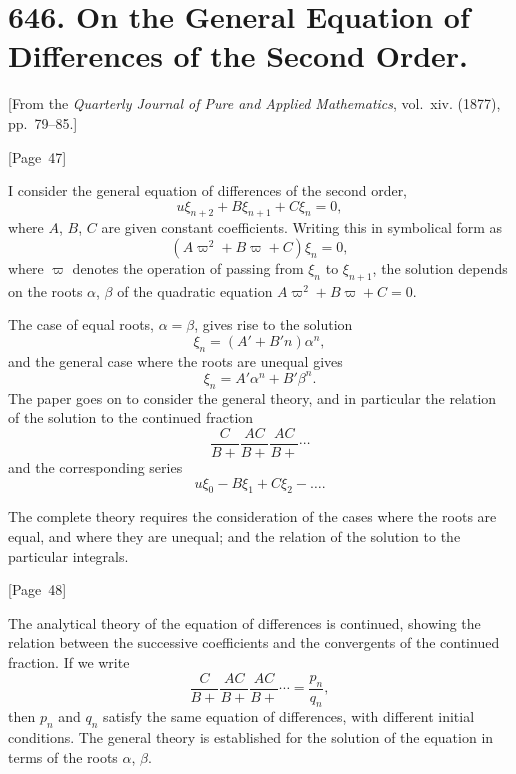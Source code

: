 \documentclass[11pt,a4paper]{article}
\theoremstyle{plain}
\theoremstyle{definition}
\theoremstyle{remark}
\begin{document}
\newpage
\section*{646. On the General Equation of Differences of the Second Order.}

[From the \textit{Quarterly Journal of Pure and Applied Mathematics},
vol.~xiv. (1877), pp.~79--85.]

\begin{center}
[Page~47]
\end{center}

I consider the general equation of differences of the second order,
\[
u \xi_{n+2} + B \xi_{n+1} + C \xi_n = 0,
\]
where $A$, $B$, $C$ are given constant coefficients. Writing this in
symbolical form as
\[
(A\varpi^2 + B\varpi + C)\xi_n = 0,
\]
where $\varpi$ denotes the operation of passing from $\xi_n$ to $\xi_{n+1}$,
the solution depends on the roots $\alpha$, $\beta$ of the quadratic
equation $A\varpi^2 + B\varpi + C = 0$.

The case of equal roots, $\alpha = \beta$, gives rise to the solution
\[
\xi_n = (A' + B'n)\alpha^n,
\]
and the general case where the roots are unequal gives
\[
\xi_n = A'\alpha^n + B'\beta^n.
\]
The paper goes on to consider the general theory, and in particular the
relation of the solution to the continued fraction
\[
\frac{C}{B+}\frac{AC}{B+}\frac{AC}{B+}\cdots
\]
and the corresponding series
\[
u \xi_0 - B\xi_1 + C\xi_2 - \dots.
\]

The complete theory requires the consideration of the cases where the
roots are equal, and where they are unequal; and the relation of the
solution to the particular integrals.

\begin{center}
[Page~48]
\end{center}

The analytical theory of the equation of differences is continued,
showing the relation between the successive coefficients and the
convergents of the continued fraction. If we write
\[
\frac{C}{B+}\frac{AC}{B+}\frac{AC}{B+}\cdots =
\frac{p_n}{q_n},
\]
then $p_n$ and $q_n$ satisfy the same equation of differences, with
different initial conditions. The general theory is established for
the solution of the equation in terms of the roots $\alpha$, $\beta$.
\end{document}
